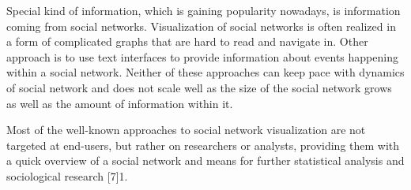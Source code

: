 \documentclass{llncs}
\begin{document}
Special kind of information, which is gaining popularity nowadays, is information coming from social networks. Visualization of social networks is often realized in a form of complicated graphs that are hard to read and navigate in. Other approach is to use text interfaces to provide information about events happening within a social network. Neither of these approaches can keep pace with dynamics of social network and does not scale well as the size of the social network grows as well as the amount of information within it.

Most of the well-known approaches to social network visualization are not targeted at end-users, but rather on researchers or analysts, providing them with a quick overview of a social network and means for further statistical analysis and sociological research [7]1.
\end{document}
